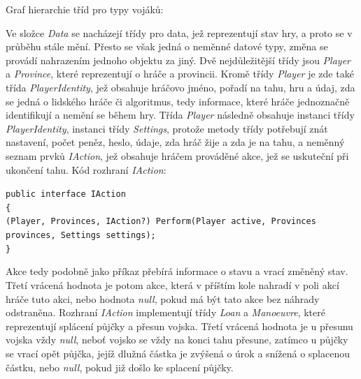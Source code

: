 \documentclass[a4paper,12pt]{article}
\def\keyword #1{\color{keyword}#1\color{black}}
\begin{document}
Graf hierarchie tříd pro typy vojáků:


Ve složce \textit{Data} se nacházejí třídy pro data, jež reprezentují stav hry, a proto se v průběhu stále mění. Přesto se však jedná o neměnné datové typy, změna se provádí nahrazením jednoho objektu za jiný. Dvě nejdůležitější třídy jsou \textit{Player} a \textit{Province}, které reprezentují o hráče a provincii. Kromě třídy \textit{Player} je zde také třída \textit{PlayerIdentity}, jež obsahuje hráčovo jméno, pořadí na tahu, hru a údaj, zda se jedná o lidského hráče či algoritmus, tedy informace, které hráče jednoznačně identifikují a nemění se během hry. Třída \textit{Player} následně obsahuje instanci třídy \textit{PlayerIdentity}, instanci třídy \textit{Settings}, protože metody třídy potřebují znát nastavení, počet peněz, heslo, údaje, zda hráč žije a zda je na tahu, a neměnný seznam prvků \textit{IAction}, jež obsahuje hráčem prováděné akce, jež se uskuteční při ukončení tahu. Kód rozhraní \textit{IAction}:

\scriptsize\selectfont
\texttt{\keyword{public interface }IAction}\\
\texttt{\{}\\
\hspace*{8mm}\texttt{(Player, Provinces, IAction?) Perform(Player active, Provinces provinces, Settings settings);}\\
\texttt{\}}\normalsize

Akce tedy podobně jako příkaz přebírá informace o stavu a vrací změněný stav. Třetí vrácená hodnota je potom akce, která v příštím kole nahradí v poli akcí hráče tuto akci, nebo hodnota \textit{null}, pokud má být tato akce bez náhrady odstraněna. Rozhraní \textit{IAction} implementují třídy \textit{Loan} a \textit{Manoeuvre}, které reprezentují splácení půjčky a přesun vojska. Třetí vrácená hodnota je u přesunu vojska vždy \textit{null}, neboť vojsko se vždy na konci tahu přesune, zatímco u půjčky se vrací opět půjčka, jejíž dlužná částka je zvýšená o úrok a snížená o splacenou částku, nebo \textit{null}, pokud již došlo ke splacení půjčky.
\end{document}
